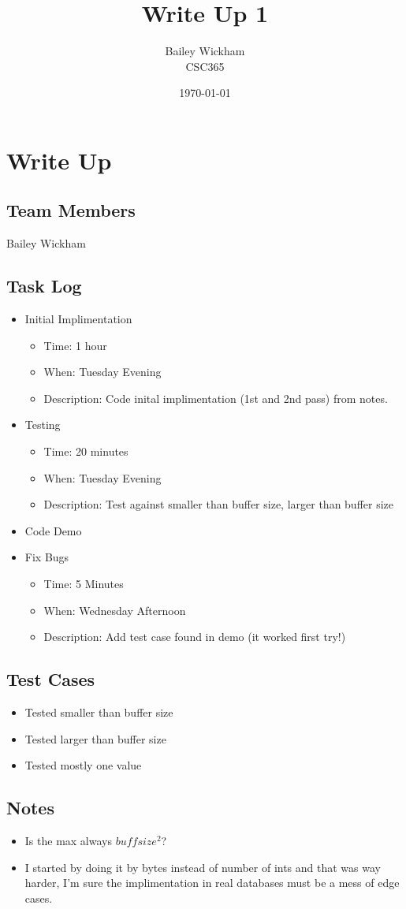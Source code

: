 \documentclass{article}
\title{Write Up 1}
\author{Bailey Wickham \\ CSC365}
\date\today
\begin{document}
\maketitle
\section{Write Up}
\subsection{Team Members}
Bailey Wickham

\subsection{Task Log}
\begin{itemize}
    \item Initial Implimentation
        \begin{itemize}
            \item Time: 1 hour
            \item When: Tuesday Evening
            \item Description: Code inital implimentation (1st and 2nd pass) from notes.
        \end{itemize}
    \item Testing
        \begin{itemize}
            \item Time: 20 minutes
            \item When: Tuesday Evening
            \item Description: Test against smaller than buffer size, larger than buffer size
        \end{itemize}
    \item Code Demo
    \item Fix Bugs
        \begin{itemize}
            \item Time: 5 Minutes
            \item When: Wednesday Afternoon
            \item Description: Add test case found in demo (it worked first try!)
        \end{itemize}
\end{itemize}
\subsection{Test Cases}
\begin{itemize}
    \item Tested smaller than buffer size
    \item Tested larger than buffer size
    \item Tested mostly one value
\end{itemize}
\subsection{Notes}
\begin{itemize}
\item Is the max always $buffsize^2$?
\item I started by doing it by bytes instead of number of ints and that was way harder, I'm sure the implimentation in real databases must be a mess of edge cases.
\end{itemize}
\end{document}
